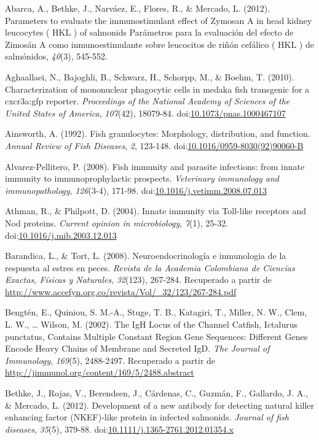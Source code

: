 \documentclass[12pt,letterpaper,oneside]{scrbook}
\begin{document}
Abarca, A., Bethke, J., Narváez, E., Flores, R., \& Mercado, L. (2012).
Parameters to evaluate the immunostimulant effect of Zymosan A in head
kidney leucocytes ( HKL ) of salmonids Parámetros para la evaluación del
efecto de Zimosán A como inmunoestimulante sobre leucocitos de riñón
cefálico ( HKL ) de salmónidos, \emph{40}(3), 545-552.

Aghaallaei, N., Bajoghli, B., Schwarz, H., Schorpp, M., \& Boehm, T.
(2010). Characterization of mononuclear phagocytic cells in medaka fish
transgenic for a cxcr3a:gfp reporter. \emph{Proceedings of the National
Academy of Sciences of the United States of America}, \emph{107}(42),
18079-84.
doi:\href{http://dx.doi.org/10.1073/pnas.1000467107}{10.1073/pnas.1000467107}

Ainsworth, A. (1992). Fish granulocytes: Morphology, distribution, and
function. \emph{Annual Review of Fish Diseases}, \emph{2}, 123-148.
doi:\href{http://dx.doi.org/10.1016/0959-8030(92)90060-B}{10.1016/0959-8030(92)90060-B}

Alvarez-Pellitero, P. (2008). Fish immunity and parasite infections:
from innate immunity to immunoprophylactic prospects. \emph{Veterinary
immunology and immunopathology}, \emph{126}(3-4), 171-98.
doi:\href{http://dx.doi.org/10.1016/j.vetimm.2008.07.013}{10.1016/j.vetimm.2008.07.013}

Athman, R., \& Philpott, D. (2004). Innate immunity via Toll-like
receptors and Nod proteins. \emph{Current opinion in microbiology},
\emph{7}(1), 25-32.
doi:\href{http://dx.doi.org/10.1016/j.mib.2003.12.013}{10.1016/j.mib.2003.12.013}

Barandica, L., \& Tort, L. (2008). Neuroendocrinología e inmunologia de
la respuesta al estres en peces. \emph{Revista de la Academia Colombiana
de Ciencias Exactas, Físicas y Naturales}, \emph{32}(123), 267-284.
Recuperado a partir de
\url{http://www.accefyn.org.co/revista/Vol/_32/123/267-284.pdf}

Bengtén, E., Quiniou, S. M.-A., Stuge, T. B., Katagiri, T., Miller, N.
W., Clem, L. W., \ldots{} Wilson, M. (2002). The IgH Locus of the
Channel Catfish, Ictalurus punctatus, Contains Multiple Constant Region
Gene Sequences: Different Genes Encode Heavy Chains of Membrane and
Secreted IgD. \emph{The Journal of Immunology}, \emph{169}(5),
2488-2497. Recuperado a partir de
\url{http://jimmunol.org/content/169/5/2488.abstract}

Bethke, J., Rojas, V., Berendsen, J., Cárdenas, C., Guzmán, F.,
Gallardo, J. A., \& Mercado, L. (2012). Development of a new antibody
for detecting natural killer enhancing factor (NKEF)-like protein in
infected salmonids. \emph{Journal of fish diseases}, \emph{35}(5),
379-88.
doi:\href{http://dx.doi.org/10.1111/j.1365-2761.2012.01354.x}{10.1111/j.1365-2761.2012.01354.x}
\end{document}
